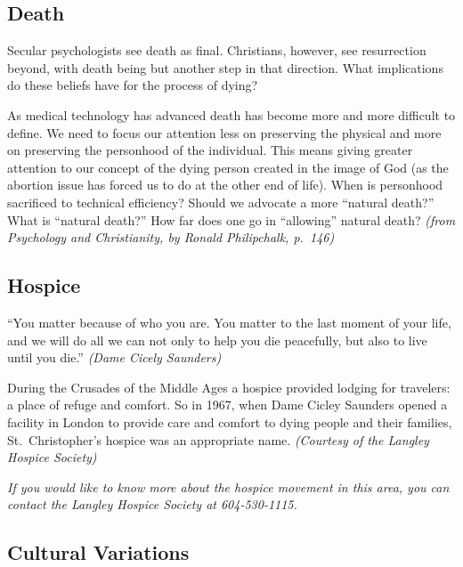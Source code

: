 \documentclass[
]{book}
\begin{document}
\hypertarget{death}{%
\subsection*{Death}\label{death}}

Secular psychologists see death as final. Christians, however, see resurrection beyond, with death being but another step in that direction. What implications do these beliefs have for the process of dying?

As medical technology has advanced death has become more and more difficult to define. We need to focus our attention less on preserving the physical and more on preserving the personhood of the individual. This means giving greater attention to our concept of the dying person created in the image of God (as the abortion issue has forced us to do at the other end of life). When is personhood sacrificed to technical efficiency? Should we advocate a more ``natural death?'' What is ``natural death?'' How far does one go in ``allowing'' natural death? \emph{(from Psychology and Christianity, by Ronald Philipchalk, p.~146)}

\hypertarget{hospice}{%
\subsection*{Hospice}\label{hospice}}

``You matter because of who you are. You matter to the last moment of your life, and we will do all we can not only to help you die peacefully, but also to live until you die.'' \emph{(Dame Cicely Saunders)}

During the Crusades of the Middle Ages a hospice provided lodging for travelers: a place of refuge and comfort. So in 1967, when Dame Cicley Saunders opened a facility in London to provide care and comfort to dying people and their families, St.~Christopher's hospice was an appropriate name. \emph{(Courtesy of the Langley Hospice Society)}

\emph{If you would like to know more about the hospice movement in this area, you can contact the Langley Hospice Society at 604-530-1115.}

\hypertarget{cultural-variations}{%
\subsection*{Cultural Variations}\label{cultural-variations}}
\end{document}
